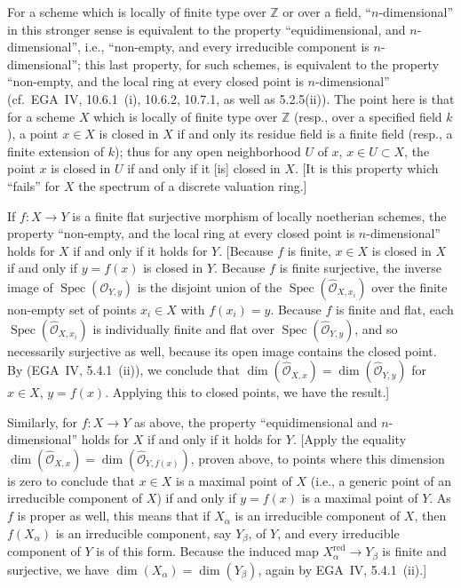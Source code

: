For a scheme which is locally of finite type over $\mathbb{Z}$ or over a field, ``$n$-dimensional'' in this stronger sense is equivalent to the property ``equidimensional, and $n$-dimensional'', i.e., ``non-empty, and every irreducible component is $n$-dimensional''; this last property, for such schemes, is equivalent to the property ``non-empty, and the local ring at every closed point is $n$-dimensional'' (cf.~EGA~IV, 10.6.1~(i), 10.6.2, 10.7.1, as well as 5.2.5(ii)). The point here is that for a scheme $X$ which is locally of finite type over $\mathbb{Z}$ (resp., over a specified field $k$), a point $x \in X$ is closed in $X$ if and only its residue field is a finite field (resp., a finite extension of $k$); thus for any open neighborhood $U$ of $x$, $x \in U \subset X$, the point $x$ is closed in $U$ if and only if it [is] closed in $X$. [It is this property which ``fails'' for $X$ the spectrum of a discrete valuation ring.]

If $f: X \to Y$ is a finite flat surjective morphism of locally noetherian schemes, the property ``non-empty, and the local ring at every closed point is $n$-dimensional'' holds for $X$ if and only if it holds for $Y$. [Because $f$ is finite, $x \in X$ is closed in $X$ if and only if $y = f(x)$ is closed in $Y$. Because $f$ is finite surjective, the inverse image of $\operatorname{Spec}(\mathcal{O}_{Y,y})$ is the disjoint union of the $\operatorname{Spec}(\widehat{\mathcal{O}}_{X,x_i})$ over the finite non-empty set of points $x_i \in X$ with $f(x_i) = y$. Because $f$ is finite and flat, each $\operatorname{Spec}(\widehat{\mathcal{O}}_{X,x_i})$ is individually finite and flat over $\operatorname{Spec}(\widehat{\mathcal{O}}_{Y,y})$, and so necessarily surjective as well, because its open image contains the closed point. By (EGA~IV, 5.4.1~(ii)), we conclude that $\dim(\widehat{\mathcal{O}}_{X,x}) = \dim(\widehat{\mathcal{O}}_{Y,y})$ for $x \in X$, $y = f(x)$. Applying this to closed points, we have the result.]

Similarly, for $f: X \to Y$ as above, the property ``equidimensional and $n$-dimensional'' holds for $X$ if and only if it holds for $Y$. [Apply the equality $\dim(\widehat{\mathcal{O}}_{X,x}) = \dim(\widehat{\mathcal{O}}_{Y,f(x)})$, proven above, to points where this dimension is zero to conclude that $x \in X$ is a maximal point of $X$ (i.e., a generic point of an irreducible component of $X$) if and only if $y = f(x)$ is a maximal point of $Y$. As $f$ is proper as well, this means that if $X_\alpha$ is an irreducible component of $X$, then $f(X_\alpha)$ is an irreducible component, say $Y_\beta$, of $Y$, and every irreducible component of $Y$ is of this form. Because the induced map $X_\alpha^{\mathrm{red}} \to Y_\beta$ is finite and surjective, we have $\dim(X_\alpha) = \dim(Y_\beta)$, again by EGA~IV, 5.4.1~(ii).]

